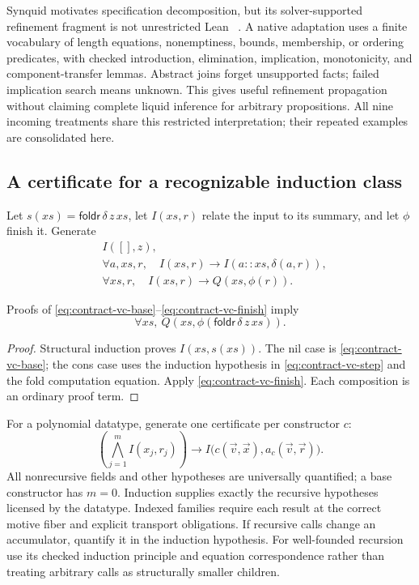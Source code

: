 Synquid motivates specification decomposition, but its solver-supported refinement fragment is not unrestricted Lean ~\cite{synquid}. A native adaptation uses a finite vocabulary of length equations, nonemptiness, bounds, membership, or ordering predicates, with checked introduction, elimination, implication, monotonicity, and component-transfer lemmas. Abstract joins forget unsupported facts; failed implication search means unknown. This gives useful refinement propagation without claiming complete liquid inference for arbitrary propositions. All nine incoming treatments share this restricted interpretation; their repeated examples are consolidated here.

\subsection{A certificate for a recognizable induction class}\label{sec:contract-local-certificates}

Let $s(xs)=\mathsf{foldr}\,\delta\,z\,xs$, let $I(xs,r)$ relate the input to its summary, and let $\phi$ finish it. Generate
\begin{align}
 &I([],z),\label{eq:contract-vc-base}\\
 &\forall a,xs,r,\quad I(xs,r)\to I(a::xs,\delta(a,r)),\label{eq:contract-vc-step}\\
 &\forall xs,r,\quad I(xs,r)\to Q(xs,\phi(r)).\label{eq:contract-vc-finish}
\end{align}

\begin{proposition}\label{prop:contract-local-certification}
Proofs of \eqref{eq:contract-vc-base}--\eqref{eq:contract-vc-finish} imply
\[
 \forall xs,\ Q(xs,\phi(\mathsf{foldr}\,\delta\,z\,xs)).
\]
\end{proposition}
\begin{proof}
Structural induction proves $I(xs,s(xs))$. The nil case is \eqref{eq:contract-vc-base}; the cons case uses the induction hypothesis in \eqref{eq:contract-vc-step} and the fold computation equation. Apply \eqref{eq:contract-vc-finish}. Each composition is an ordinary proof term.
\end{proof}

For a polynomial datatype, generate one certificate per constructor $c$:
\[
 \left(\bigwedge_{j=1}^{m}I(x_j,r_j)\right)
 \longrightarrow I\bigl(c(\vec v,\vec x),a_c(\vec v,\vec r)\bigr).
\]
All nonrecursive fields and other hypotheses are universally quantified; a base constructor has $m=0$. Induction supplies exactly the recursive hypotheses licensed by the datatype. Indexed families require each result at the correct motive fiber and explicit transport obligations. If recursive calls change an accumulator, quantify it in the induction hypothesis. For well-founded recursion use its checked induction principle and equation correspondence rather than treating arbitrary calls as structurally smaller children.

